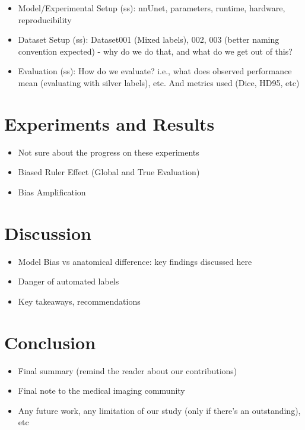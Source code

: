 \documentclass[runningheads]{llncs}
\begin{document}
\begin{itemize}
    \item Model/Experimental Setup (ss): nnUnet, parameters, runtime, hardware, reproducibility
    \item Dataset Setup (ss): Dataset001 (Mixed labels), 002, 003 (better naming convention expected) - why do we do that, and what do we get out of this?
    \item Evaluation (ss): How do we evaluate? i.e., what does observed performance mean (evaluating with silver labels), etc. And metrics used (Dice, HD95, etc)
\end{itemize}

\section{Experiments and Results}

\begin{itemize}
    \item Not sure about the progress on these experiments
    \item Biased Ruler Effect (Global and True Evaluation)
    \item Bias Amplification
\end{itemize}

\section{Discussion}

\begin{itemize}
    \item Model Bias vs anatomical difference: key findings discussed here
    \item Danger of automated labels
    \item Key takeaways, recommendations
\end{itemize}

\section{Conclusion}

\begin{itemize}
    \item Final summary (remind the reader about our contributions)
    \item Final note to the medical imaging community
    \item Any future work, any limitation of our study (only if there's an outstanding), etc
\end{itemize}
\end{document}
